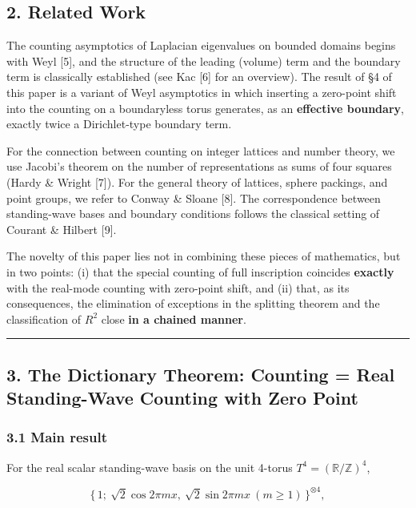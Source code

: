 \documentclass[
]{article}
\begin{document}
\subsection{2. Related Work}\label{related-work}

The counting asymptotics of Laplacian eigenvalues on bounded domains
begins with Weyl {[}5{]}, and the structure of the leading (volume) term
and the boundary term is classically established (see Kac {[}6{]} for an
overview). The result of §4 of this paper is a variant of Weyl
asymptotics in which inserting a zero-point shift into the counting on a
boundaryless torus generates, as an \textbf{effective boundary}, exactly
twice a Dirichlet-type boundary term.

For the connection between counting on integer lattices and number
theory, we use Jacobi's theorem on the number of representations as sums
of four squares (Hardy \& Wright {[}7{]}). For the general theory of
lattices, sphere packings, and point groups, we refer to Conway \&
Sloane {[}8{]}. The correspondence between standing-wave bases and
boundary conditions follows the classical setting of Courant \& Hilbert
{[}9{]}.

The novelty of this paper lies not in combining these pieces of
mathematics, but in two points: (i) that the special counting of full
inscription coincides \textbf{exactly} with the real-mode counting with
zero-point shift, and (ii) that, as its consequences, the elimination of
exceptions in the splitting theorem and the classification of \(R^2\)
close \textbf{in a chained manner}.

\begin{center}\rule{0.5\linewidth}{0.5pt}\end{center}

\subsection{3. The Dictionary Theorem: Counting = Real Standing-Wave
Counting with Zero
Point}\label{the-dictionary-theorem-counting-real-standing-wave-counting-with-zero-point}

\subsubsection{3.1 Main result}\label{main-result}

For the real scalar standing-wave basis on the unit 4-torus
\(T^4=(\mathbb{R}/\mathbb{Z})^4\),

\[
\{\,1;\ \sqrt2\cos 2\pi m x,\ \sqrt2\sin 2\pi m x\ (m\ge1)\,\}^{\otimes 4},
\]
\end{document}
